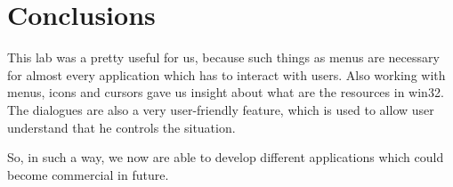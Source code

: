 \section*{Conclusions}

This lab was a pretty useful for us, because such things as menus are necessary for almost every application which has to interact with users. Also working with menus, icons and cursors gave us insight about what are the resources in win32. The dialogues are also a very user-friendly feature, which is used to allow user understand that he controls the situation.

So, in such a way, we now are able to develop different applications which could become commercial in future.

\clearpage